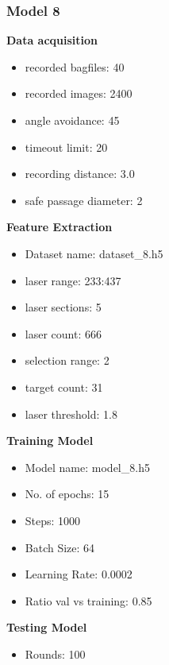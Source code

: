 \subsubsection{Model 8\label{model_8} }
\begin{multicols}{2}\textbf{Data acquisition}
\begin{itemize}
\setlength\itemsep{0.1em}
\item recorded bagfiles: 40
\item recorded images: 2400
\item angle avoidance: 45
\item timeout limit: 20
\item recording distance: 3.0
\item safe passage diameter: 2
\end{itemize}
\textbf{Feature Extraction}
\begin{itemize}
\setlength\itemsep{0.1em}
\item Dataset name: dataset\_8.h5
\item  laser range: 233:437
\item  laser sections: 5
\item  laser count: 666
\item  selection range: 2
\item  target count: 31
\item  laser threshold: 1.8
\end{itemize}
\columnbreak\textbf{Training Model}
\begin{itemize}
\setlength\itemsep{0.1em}
\item  Model name: model\_8.h5
\item  No. of epochs: 15
\item  Steps: 1000
\item  Batch Size: 64
\item  Learning Rate: 0.0002
\item  Ratio val vs training: 0.85
\end{itemize}
\textbf{Testing Model}
\begin{itemize}
\setlength\itemsep{0.1em}
\item Rounds: 100
\newline
\newline
\newline
\newline
\newline
\newline
\newline
\newline
\end{itemize}

\end{multicols}
